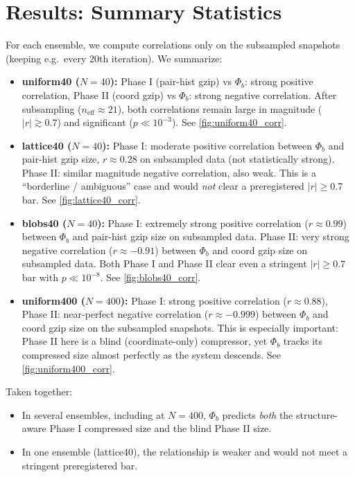 \documentclass[11pt,a4paper]{article}
\numberwithin{equation}{section}
\newcommand{\phib}{\Phi_b}
\begin{document}
\section{Results: Summary Statistics}
For each ensemble, we compute correlations only on the subsampled snapshots (keeping e.g.\ every 20th iteration). We summarize:

\begin{itemize}
\item \textbf{uniform40 ($N{=}40$):}
  Phase I (pair-hist gzip) vs $\phib$: strong positive correlation,
  Phase II (coord gzip) vs $\phib$: strong negative correlation.
  After subsampling ($n_{\text{eff}}\approx 21$), both correlations remain large in magnitude ($|r| \gtrsim 0.7$) and significant ($p \ll 10^{-3}$).
  See \cref{fig:uniform40_corr}.

\item \textbf{lattice40 ($N{=}40$):}
  Phase I: moderate positive correlation between $\phib$ and pair-hist gzip size, $r \approx 0.28$ on subsampled data (not statistically strong).
  Phase II: similar magnitude negative correlation, also weak.
  This is a ``borderline / ambiguous'' case and would \emph{not} clear a preregistered $|r|\ge 0.7$ bar.
  See \cref{fig:lattice40_corr}.

\item \textbf{blobs40 ($N{=}40$):}
  Phase I: extremely strong positive correlation ($r \approx 0.99$) between $\phib$ and pair-hist gzip size on subsampled data.
  Phase II: very strong negative correlation ($r \approx -0.91$) between $\phib$ and coord gzip size on subsampled data.
  Both Phase I and Phase II clear even a stringent $|r|\ge 0.7$ bar with $p \ll 10^{-8}$.
  See \cref{fig:blobs40_corr}.

\item \textbf{uniform400 ($N{=}400$):}
  Phase I: strong positive correlation ($r \approx 0.88$),
  Phase II: near-perfect negative correlation ($r \approx -0.999$) between $\phib$ and coord gzip size on the subsampled snapshots.
  This is especially important: Phase II here is a blind (coordinate-only) compressor, yet $\phib$ tracks its compressed size almost perfectly as the system descends.
  See \cref{fig:uniform400_corr}.

\end{itemize}

\noindent
Taken together:
\begin{itemize}
\item In several ensembles, including at $N{=}400$, $\phib$ predicts \emph{both} the structure-aware Phase I compressed size and the blind Phase II size.
\item In one ensemble (lattice40), the relationship is weaker and would not meet a stringent preregistered bar.
\end{itemize}
\end{document}
